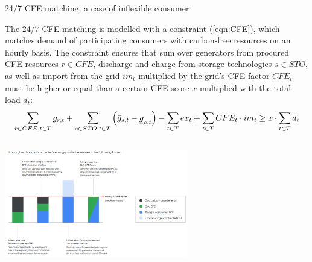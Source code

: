 \begin{frame}{24/7 CFE matching: a case of inflexible consumer}

  {\footnotesize

  The \alert{24/7 CFE matching} is modelled with a constraint (\ref{eqn:CFE}), 
  which matches demand of participating consumers with carbon-free resources on an hourly basis.  The constraint ensures that sum over generators from procured CFE resources $r\in CFE$, discharge and charge from storage technologies $s\in STO$,
  as well as import from the grid $im_t$ multiplied by the grid's CFE factor $CFE_t$
  must be higher or equal than a certain \alert{CFE score} $x$ multiplied with the total load $d_t$:
  \vspace{0.1cm}
  \begin{equation}
  \sum_{r\in CFE, t\in T} g_{r,t} + \sum_{s\in STO, t\in T} \left(\bar{g}_{s,t} - \ubar{g}_{s,t}\right) - \sum_{t\in T} ex_t + \sum_{t\in T} CFE_t \cdot im_t \geq x \cdot \sum_{t\in T} d_t
  \label{eqn:CFE}
  \end{equation}

  \vspace{0.3cm}

  \begin{columns}[T]
    \begin{column}{7.5cm}
    \centering  
    \includegraphics[width=8cm]{images/247-concept.png}
    \end{column}
    \begin{column}{6cm}
    \vspace{0.3cm}
      \noindent{} 

    \end{column}
    \end{columns}
    }
\end{frame}


